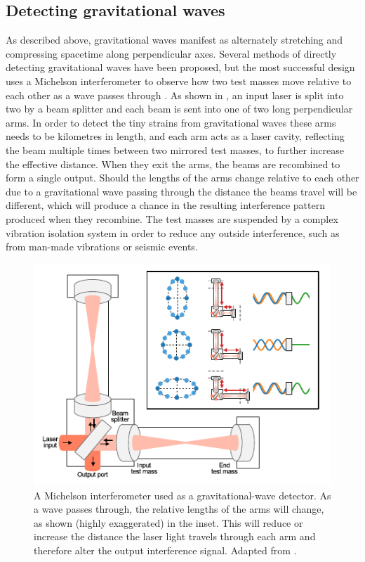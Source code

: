 \subsection{Detecting gravitational waves}
\label{sec:gw_detecting}
\begin{colsection}

As described above, gravitational waves manifest as alternately stretching and compressing spacetime along perpendicular axes. Several methods of directly detecting gravitational waves have been proposed, but the most successful design uses a Michelson interferometer to observe how two test masses move relative to each other as a wave passes through \citep{BIGbirmingham}. As shown in , an input laser is split into two by a beam splitter and each beam is sent into one of two long perpendicular arms. In order to detect the tiny strains from gravitational waves these arms needs to be kilometres in length, and each arm acts as a laser cavity, reflecting the beam multiple times between two mirrored test masses, to further increase the effective distance. When they exit the arms, the beams are recombined to form a single output. Should the lengths of the arms change relative to each other due to a gravitational wave passing through the distance the beams travel will be different, which will produce a chance in the resulting interference pattern produced when they recombine. The test masses are suspended by a complex vibration isolation system in order to reduce any outside interference, such as from man-made vibrations or seismic events.

\begin{figure}[t]
    \begin{center}
        \includegraphics[width=0.75\linewidth]{images/detector.pdf}
    \end{center}
    \caption[A Michelson interferometer used as a gravitational-wave detector]{
        A Michelson interferometer used as a gravitational-wave detector. As a wave passes through, the relative lengths of the arms will change, as shown (highly exaggerated) in the inset. This will reduce or increase the distance the laser light travels through each arm and therefore alter the output interference signal. Adapted from \citet{GW150914_detectors}.
        }\label{fig:detector}
\end{figure}


\end{colsection}
